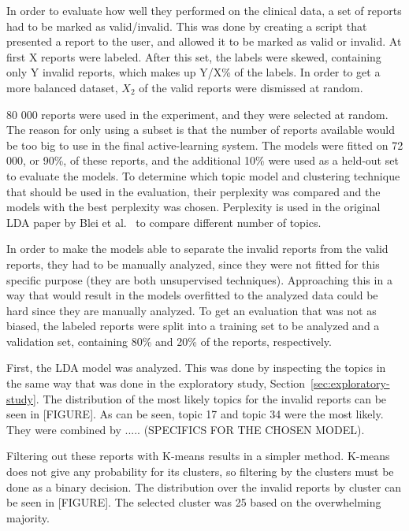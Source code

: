 In order to evaluate how well they performed on the clinical data, a set of reports had to be marked as valid/invalid.
This was done by creating a script that presented a report to the user, and allowed it to be marked as valid or invalid.
At first X reports were labeled.
After this set, the labels were skewed, containing only Y invalid reports, which makes up Y/X\% of the labels.
In order to get a more balanced dataset, $X_2$ of the valid reports were dismissed at random.

80 000 reports were used in the experiment, and they were selected at random.
The reason for only using a subset is that the number of reports available would be too big to use in the final active-learning system. %
The models were fitted on 72 000, or 90\%, of these reports, and the additional 10\% were used as a held-out set to evaluate the models.
To determine which topic model and clustering technique that should be used in the evaluation, their perplexity was compared and the models with the best perplexity was chosen.
Perplexity is used in the original LDA paper by Blei et al\@.~\cite{blei2003latent} to compare different number of topics.

In order to make the models able to separate the invalid reports from the valid reports, they had to be manually analyzed, since they were not fitted for this specific purpose (they are both unsupervised techniques).
Approaching this in a way that would result in the models overfitted to the analyzed data could be hard since they are manually analyzed. 
To get an evaluation that was not as biased, the labeled reports were split into a training set to be analyzed and a validation set, containing 80\% and 20\% of the reports, respectively.

First, the LDA model was analyzed.
This was done by inspecting the topics in the same way that was done in the exploratory study, Section~\ref{sec:exploratory-study}.
The distribution of the most likely topics for the invalid reports can be seen in [FIGURE].
As can be seen, topic 17 and topic 34 were the most likely.
They were combined by ..... (SPECIFICS FOR THE CHOSEN MODEL).

Filtering out these reports with K-means results in a simpler method.
K-means does not give any probability for its clusters, so filtering by the clusters must be done as a binary decision.
The distribution over the invalid reports by cluster can be seen in [FIGURE].
The selected cluster was 25 based on the overwhelming majority.


